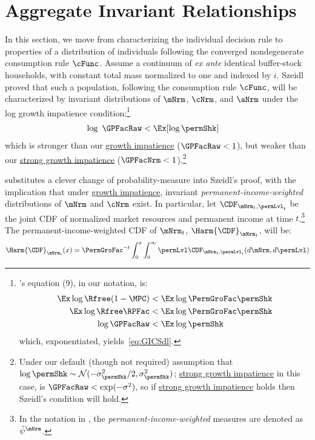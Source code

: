 \documentclass[BufferStockTheory]{subfiles}
\begin{document}
\section{Aggregate Invariant Relationships}
In this section, we move from characterizing the individual decision rule to properties of a distribution of individuals following the converged nondegenerate consumption rule $\cFunc$. Assume a continuum of \textit{ex ante} identical buffer-stock households, with constant total mass normalized to one and indexed by $i$. Szeidl~\citeyearpar{szeidlInvariant} proved that such a population, following the consumption rule $\cFunc$, will be characterized by invariant distributions of $\mNrm$, $\cNrm$, and $\aNrm$ under the log growth impatience condition:\footnote{\cite{szeidlInvariant}'s equation (9), in our notation, is:
  \begin{align*}
    \Ex \log \Rfree (1-\MPC) & < \Ex \log \PermGroFac \permShk
    \\  \Ex \log \Rfree \RPFac  &  < \Ex \log \PermGroFac \permShk
    \\ \log \GPFacRaw & < \Ex \log \permShk
  \end{align*}
  which, exponentiated, yields~\eqref{eq:GICSdl}.}
\hypertarget{GICSdl}{}
\begin{align}
   \log~\GPFacRaw & < \Ex [\log \permShk] \label{eq:GICSdl}
\end{align}
which is stronger than our \hyperlink{GICRaw}{growth impatience} ($\GPFacRaw < 1$), but weaker than our \hyperlink{GICMod}{strong growth impatience}  ($\GPFacNrm < 1$).\footnote{Under our default (though not required) assumption that $\log \permShk \sim \mathcal{N}(-\sigma^{2}_{\permShk}/2,\sigma^{2}_{\permShk})$; \hyperlink{GICMod}{strong growth impatience} in this case, is $\GPFacRaw < \exp(-\sigma^{2})$, so if \hyperlink{GICMod}{strong growth impatience} holds then Szeidl's condition will hold.}

\hypertarget{Growth-Rates-of-Aggregate-Income-and-Consumption}{}

\cite{harmenbergInvariant} substitutes a clever change of probability-measure into Szeidl's proof, with the implication that under \hyperlink{GICRaw}{growth impatience}, invariant \emph{permanent-income-weighted} distributions of $\mNrm$ and $\cNrm$ exist. In particular, let $\CDF_{\mNrm_{t},\permLvl_{t}}$ be the joint CDF of normalized market resources and permanent income at time $t$.\footnote{In the notation in \cite{harmenbergInvariant}, the \emph{permanent-income-weighted} measures are denoted as $\tilde{\psi}^{\mNrm}$.} The permanent-income-weighted CDF of $\mNrm_{t}$, $\Harm{\CDF}_{\mNrm_{t}}$, will be:
%
%
%
\begin{equation}\label{eq:HarmCDF}
\Harm{\CDF}_{\mNrm_{t}}(x) = \PermGroFac^{-t}\int_{0}^{x}\int_{0}^{\infty} \permLvl\CDF_{\mNrm_{t},\permLvl_{t}}(d\mNrm,d\permLvl)
\end{equation}
\end{document}
